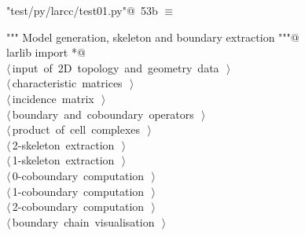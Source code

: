 \documentclass[11pt,oneside]{article}    %
\begin{document}
\begin{flushleft} \small \label{scrap86}
\protect{}\verb@"test/py/larcc/test01.py"@\nobreak\ {\footnotesize 53b }$\equiv$
\vspace{-1ex}
\begin{list}{}{} \item
\mbox{}\verb@""" Model generation, skeleton and boundary extraction """@\\
\mbox{}\verb@from larlib import *@\\
\mbox{}\verb@@\hbox{$\langle\,$input of 2D topology and geometry data\nobreak\ {\footnotesize {}}$\,\rangle$}\verb@@\\
\mbox{}\verb@@\hbox{$\langle\,$characteristic matrices\nobreak\ {\footnotesize {}}$\,\rangle$}\verb@@\\
\mbox{}\verb@@\hbox{$\langle\,$incidence matrix\nobreak\ {\footnotesize {}}$\,\rangle$}\verb@@\\
\mbox{}\verb@@\hbox{$\langle\,$boundary and coboundary operators\nobreak\ {\footnotesize {}}$\,\rangle$}\verb@@\\
\mbox{}\verb@@\hbox{$\langle\,$product of cell complexes\nobreak\ {\footnotesize {}}$\,\rangle$}\verb@@\\
\mbox{}\verb@@\hbox{$\langle\,$2-skeleton extraction\nobreak\ {\footnotesize {}}$\,\rangle$}\verb@@\\
\mbox{}\verb@@\hbox{$\langle\,$1-skeleton extraction\nobreak\ {\footnotesize {}}$\,\rangle$}\verb@@\\
\mbox{}\verb@@\hbox{$\langle\,$0-coboundary computation\nobreak\ {\footnotesize {}}$\,\rangle$}\verb@@\\
\mbox{}\verb@@\hbox{$\langle\,$1-coboundary computation\nobreak\ {\footnotesize {}}$\,\rangle$}\verb@@\\
\mbox{}\verb@@\hbox{$\langle\,$2-coboundary computation\nobreak\ {\footnotesize {}}$\,\rangle$}\verb@@\\
\mbox{}\verb@@\hbox{$\langle\,$boundary chain visualisation\nobreak\ {\footnotesize {}}$\,\rangle$}\verb@@\\
\mbox{}\verb@@{\NWsep}
\end{list}
\vspace{-2ex}
\end{flushleft}
\end{document}
